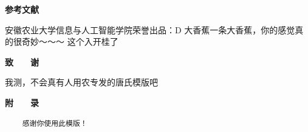\documentclass[UTF8,a4paper,12pt]{ctexart}
\begin{document}
	\newpage
	 
	\centerline{\textbf{\fontsize{16pt}{\baselineskip}\heiti 参考文献}}
	\vspace{-0.5cm} 
	\renewcommand{\refname}{\leftline{Reference}}
	\begin{thebibliography}{}
		\vspace{-1cm} 
		安徽农业大学信息与人工智能学院荣誉出品：D
		大香蕉一条大香蕉，你的感觉真的很奇妙～～～
		这个入开桂了
	\end{thebibliography}
	
	\newpage
	 
	\centerline{\textbf{\fontsize{16pt}{\baselineskip}\heiti 致　　谢}}
	\vspace{0.4cm}
	我测，不会真有人用农专发的唐氏模版吧
	\newpage
	\pagestyle{empty}
	 
	\centerline{\textbf{\fontsize{16pt}{\baselineskip}\heiti 附　　录}}
	\begin{spacing}{1.1}
	\begin{verbatim}
	感谢你使用此模版！
		
	\end{verbatim}
	\end{spacing}
	
	
\end{document}
